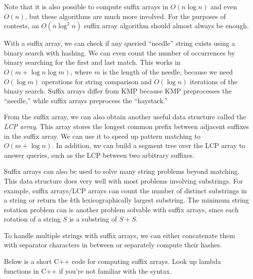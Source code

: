 Note that it is also possible to compute suffix arrays in $O(n \log n)$ and even $O(n)$, but these algorithms are much more involved. For the purposes of contests, an $O(n \log^2 n)$ suffix array algorithm should almost always be enough.

With a suffix array, we can check if any queried ``needle'' string exists using a binary search with hashing. We can even count the number of occurrences by binary searching for the first and last match. This works in $O(m + \log n \log m)$, where $m$ is the length of the needle, because we need $O(\log m)$ operations for string comparison and $O(\log n)$ iterations of the binary search. Suffix arrays differ from KMP because KMP preprocesses the ``needle,'' while suffix arrays preprocess the ``haystack.'' 

From the suffix array, we can also obtain another useful data structure called the \emph{LCP array}. This array stores the longest common prefix between adjacent suffixes in the suffix array. We can use it to speed up pattern matching to $O(m + \log n)$. In addition, we can build a segment tree over the LCP array to answer queries, such as the LCP between two arbitrary suffixes.

Suffix arrays can also be used to solve many string problems beyond matching. This data structure does very well with most problems involving substrings. For example, suffix arrays/LCP arrays can count the number of distinct substrings in a string or return the $k$th lexicographically largest substring. The minimum string rotation problem can is another problem solvable with suffix arrays, since each rotation of a string $S$ is a substring of $S + S$.

To handle multiple strings with suffix arrays, we can either concatenate them with separator characters in between or separately compute their hashes.

Below is a short C++ code for computing suffix arrays. Look up lambda functions in C++ if you're not familiar with the syntax.


